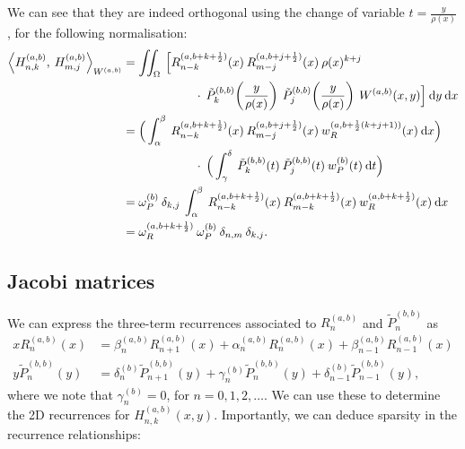\documentclass[11pt, oneside]{article}   	%
\newcommand{\half}{\frac{1}{2}}
\newcommand{\R}{\mathbb{R}}
\newcommand{\hdop}{H}
\newcommand{\hdopnkab}{\hdop_{n,k}^{(a,b)}}
\newcommand{\Wab}{{W^{(a,b)}}}
\newcommand{\hdopmjab}{\hdop_{m,j}^{(a,b)}}
\newcommand{\jac}{{\tilde P}}
\newcommand{\genjac}{R}
\newcommand{\genjacnmk}{\genjac_{n-k}}
\newcommand{\genjacmmj}{\genjac_{m-j}}
\newcommand{\genjacw}{w_\genjac}
\newcommand{\jacw}{w_P}
\newcommand{\normgenjac}{\omega_\genjac}
\newcommand{\normjac}{\omega_P}
\begin{document}
We can see that they are indeed orthogonal using the change of variable $t = \frac{y}{\rho(x)}$, for the following normalisation:
\begin{align}
	\ip< \hdopnkab, \: \hdopmjab >_\Wab &=  \iint_\Omega \: \Big[ \genjacnmk^{(a,b+k+\half)}(x) \: \genjacmmj^{(a,b+j+\half)}(x) \: \rho(x)^{k+j}  \nonumber \\
		&\quad \quad \quad \quad \quad \quad \cdot \: \jac_k^{(b,b)}\fpr(\frac{y}{\rho(x)}) \: \jac_j^{(b,b)}\fpr(\frac{y}{\rho(x)})  \: \Wab(x,y) \Big] \: \D y \: \D x \nonumber \\
	&= \Big( \int_\alpha^\beta \: {\genjacnmk^{(a,b+k+\half)}}(x) \: {\genjacmmj^{(a,b+j+\half)}}(x) \: \genjacw^{(a,b+\half(k+j+1))}(x) \: \D x \Big) \nonumber \\
	&\quad \quad \quad \quad \quad \quad \cdot \: \Big( \int_\gamma^\delta \: {\jac_k^{(b,b)}}(t) \:  {\jac_j^{(b,b)}}(t) \: \jacw^{(b)}(t) \: \D t \Big) \nonumber \\
	&= \normjac^{(b)} \: \delta_{k,j} \: \int_\alpha^\beta \: {\genjacnmk^{(a,b+k+\half)}}(x) \: {\genjac_{m-k}^{(a,b+k+\half)}}(x) \: \genjacw^{(a,b+k+\half)}(x) \: \D x \nonumber \\ 
	&= \normgenjac^{(a,b+k+\half)} \: \normjac^{(b)} \: \delta_{n,m} \: \delta_{k,j}. \label{eqn:normhdop}
\end{align}


\subsection{Jacobi matrices}

We can express the three-term recurrences associated to $\genjac_n^{(a,b)}$ and $\jac_n^{(b,b)}$ as 
\begin{align}
	x \genjac_n^{(a,b)}(x) &= \beta_n^{(a,b)} \genjac_{n+1}^{(a,b)}(x) + \alpha_n^{(a,b)} \genjac_n^{(a,b)}(x) + \beta_{n-1}^{(a,b)} \genjac_{n-1}^{(a,b)}(x) \label{eqn:Hrecurrence} \\
	y \jac_n^{(b,b)}(y) &= \delta_n^{(b)} \jac_{n+1}^{(b,b)}(y) + \gamma_n^{(b)} \jac_n^{(b,b)}(y) + \delta_{n-1}^{(b)} \jac_{n-1}^{(b,b)}(y),
\end{align}
where we note that \(\gamma_n^{(b)} = 0\), for \( n = 0,1,2,\dots\). We can use these to determine the 2D recurrences for $\hdopnkab(x,y)$. Importantly, we can deduce sparsity in the recurrence relationships:
\end{document}

